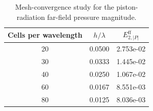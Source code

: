 \begin{table}[htbp]
\centering
\begin{tabular}{ccc}
\hline
Cells per wavelength & $h/\lambda$ & $E_{2,|P|}^{\mathrm{ff}}$ \\
\hline
20 & 0.0500 & 2.753e-02 \\
30 & 0.0333 & 1.445e-02 \\
40 & 0.0250 & 1.067e-02 \\
60 & 0.0167 & 8.551e-03 \\
80 & 0.0125 & 8.036e-03 \\
\hline
\end{tabular}
\caption{Mesh-convergence study for the piston-radiation far-field pressure magnitude.}
\label{tab:pistonFarFieldConvergence}
\end{table}
